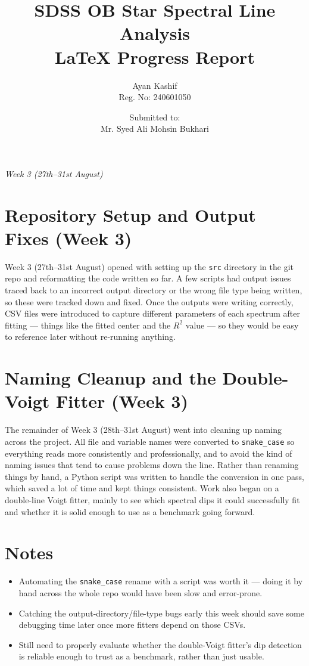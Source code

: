 \documentclass[12pt]{article}
\title{\textbf{SDSS OB Star Spectral Line Analysis}\\
\large LaTeX Progress Report}
\author{Ayan Kashif \\ \small Reg. No: 240601050}
\date{Submitted to:\\Mr. Syed Ali Mohsin Bukhari}
\begin{document}
\maketitle
\thispagestyle{empty}

\begin{center}
\textit{ Week 3 (27th--31st August)}
\end{center}

\clearpage
\tableofcontents
\clearpage


\section{Repository Setup and Output Fixes (Week 3)}
\label{sec:repo-setup}

Week 3 (27th--31st August) opened with setting up the \texttt{src} directory in the git repo and reformatting the code written so far. A few scripts had output issues traced back to an incorrect output directory or the wrong file type being written, so these were tracked down and fixed. Once the outputs were writing correctly, CSV files were introduced to capture different parameters of each spectrum after fitting --- things like the fitted center and the $R^2$ value --- so they would be easy to reference later without re-running anything.

\section{Naming Cleanup and the Double-Voigt Fitter (Week 3)}
\label{sec:naming-cleanup}

The remainder of Week 3 (28th--31st August) went into cleaning up naming across the project. All file and variable names were converted to \texttt{snake\_case} so everything reads more consistently and professionally, and to avoid the kind of naming issues that tend to cause problems down the line. Rather than renaming things by hand, a Python script was written to handle the conversion in one pass, which saved a lot of time and kept things consistent. Work also began on a double-line Voigt fitter, mainly to see which spectral dips it could successfully fit and whether it is solid enough to use as a benchmark going forward.

\section{Notes}
\label{sec:notes}

\begin{itemize}[leftmargin=*]
  \item Automating the \texttt{snake\_case} rename with a script was worth it --- doing it by hand across the whole repo would have been slow and error-prone.
  \item Catching the output-directory/file-type bugs early this week should save some debugging time later once more fitters depend on those CSVs.
  \item Still need to properly evaluate whether the double-Voigt fitter's dip detection is reliable enough to trust as a benchmark, rather than just usable.
\end{itemize}
\end{document}
